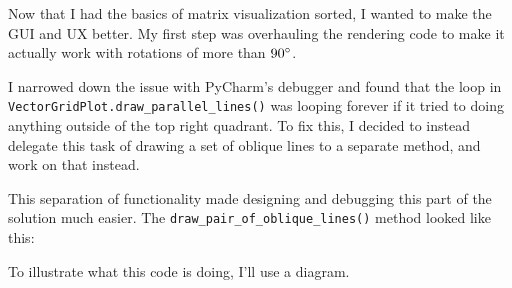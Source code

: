 \documentclass[../main.tex]{subfiles}
\begin{document}
Now that I had the basics of matrix visualization sorted, I wanted to make the GUI and UX better. My first step was overhauling the rendering code to make it actually work with rotations of more than $90\degree$.

I narrowed down the issue with PyCharm's debugger and found that the loop in \texttt{VectorGridPlot.draw\_parallel\_lines()} was looping forever if it tried to doing anything outside of the top right quadrant. To fix this, I decided to instead delegate this task of drawing a set of oblique lines to a separate method, and work on that instead.


This separation of functionality made designing and debugging this part of the solution much easier. The \texttt{draw\_pair\_of\_oblique\_lines()} method looked like this:


To illustrate what this code is doing, I'll use a diagram.
\end{document}
